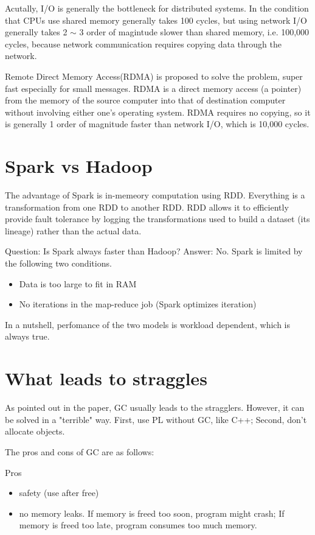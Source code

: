 Acutally, I/O is generally the bottleneck for distributed systems. In the condition that CPUs use shared memory generally takes 100 cycles, but using network I/O generally takes 2 $\sim$ 3 order of magintude slower than shared memory, i.e. 100,000 cycles, because network communication requires copying data through the network.

Remote Direct Memory Access(RDMA) is proposed to solve the problem, super fast especially for small messages. RDMA is a direct memory access (a pointer) from the memory of the source computer into that of destination computer without involving either one's operating system. RDMA requires no copying, so it is generally 1 order of magnitude faster than network I/O, which is 10,000 cycles.

\section{Spark vs Hadoop}
The advantage of Spark is in-memeory computation using RDD. Everything is a transformation from one RDD to another RDD. RDD allows it to efficiently provide fault tolerance by logging the transformations used to build a dataset (its lineage) rather than the actual data.

Question: Is Spark always faster than Hadoop?
Answer: No. Spark is limited by the following two conditions.
\begin{itemize}
  \item Data is too large to fit in RAM
  \item No iterations in the map-reduce job (Spark optimizes iteration)
\end{itemize}
In a nutshell, perfomance of the two models is workload dependent, which is always true.



\section{What leads to straggles}
As pointed out in the paper, GC usually leads to the stragglers. However, it can be solved in a "terrible" way. First, use PL without GC, like C++; Second, don't allocate objects.

The pros and cons of GC are as follows:

Pros
\begin{itemize}
  \item safety (use after free)
  \item no memory leaks. If memory is freed too soon, program might crash; If memory is freed too late, program consumes too much memory.
\end{itemize}

